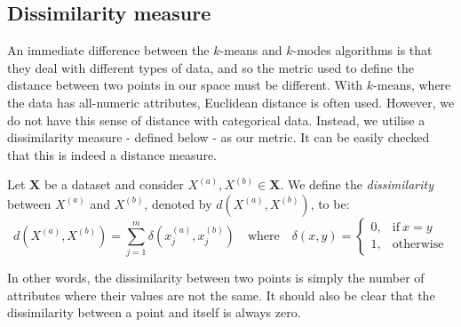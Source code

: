 \subsection{Dissimilarity measure}\label{subsec:dissim}

An immediate difference between the \(k\)-means and \(k\)-modes algorithms is 
that they deal with different types of data, and so the metric used to define 
the distance between two points in our space must be different. With 
\(k\)-means, where the data has all-numeric attributes, Euclidean distance is 
often used. However, we do not have this sense of distance with categorical 
data. Instead, we utilise a dissimilarity measure - defined below - as our 
metric. It can be easily checked that this is indeed a distance measure.\\

\begin{definition}\label{def:dissim}
    Let \(\textbf{X}\) be a dataset and consider \(X^{(a)}, X^{(b)} \in 
    \textbf{X}\). We define the \emph{dissimilarity} between \(X^{(a)}\) and 
    \(X^{(b)}\), denoted by \(d(X^{(a)}, X^{(b)})\), to be:
	\[
	    d(X^{(a)}, X^{(b)}) = \sum_{j=1}^{m} \delta(x_j^{(a)}, x_j^{(b)}) \quad
	    \text{where} \quad \delta(x, y) = \begin{cases}
                                            0, & \text{if} \ x = y \\
					                        1, & \text{otherwise}
					                      \end{cases}
	\]

    In other words, the dissimilarity between two points is simply the number of
    attributes where their values are not the same. It should also be clear that
    the dissimilarity between a point and itself is always zero.
\end{definition}


